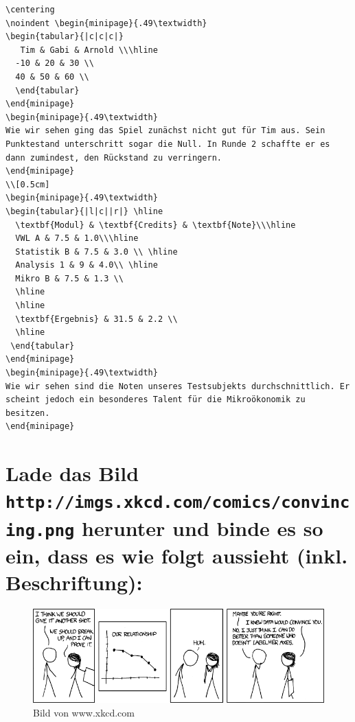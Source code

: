 \begin{Antwort}
\begin{lstlisting}[style=latex]
\centering
\noindent \begin{minipage}{.49\textwidth}
\begin{tabular}{|c|c|c|} 
   Tim & Gabi & Arnold \\\hline
  -10 & 20 & 30 \\ 
  40 & 50 & 60 \\ 
  \end{tabular}
\end{minipage}
\begin{minipage}{.49\textwidth}
Wie wir sehen ging das Spiel zunächst nicht gut für Tim aus. Sein Punktestand unterschritt sogar die Null. In Runde 2 schaffte er es dann zumindest, den Rückstand zu verringern.
\end{minipage}
\\[0.5cm]
\begin{minipage}{.49\textwidth}
\begin{tabular}{|l|c||r|} \hline
  \textbf{Modul} & \textbf{Credits} & \textbf{Note}\\\hline
  VWL A & 7.5 & 1.0\\\hline
  Statistik B & 7.5 & 3.0 \\ \hline
  Analysis 1 & 9 & 4.0\\ \hline
  Mikro B & 7.5 & 1.3 \\
  \hline
  \hline
  \textbf{Ergebnis} & 31.5 & 2.2 \\
  \hline
 \end{tabular}
\end{minipage}
\begin{minipage}{.49\textwidth}
Wie wir sehen sind die Noten unseres Testsubjekts durchschnittlich. Er scheint jedoch ein besonderes Talent für die Mikroökonomik zu besitzen.
\end{minipage}
\end{lstlisting}
\end{Antwort}

\section{Lade das Bild \texttt{http://imgs.xkcd.com/comics/convincing.png} herunter und binde es so ein, dass es wie folgt aussieht (inkl. Beschriftung):}\label{aufgabe:xkcd}
\begin{figure}[h]
\centering
\includegraphics[scale=0.5]{images/convincing.png}
\caption{Bild von www.xkcd.com}
\end{figure}
\FloatBarrier

